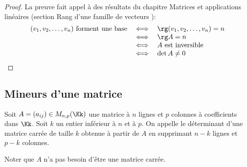 \documentclass[class=report,crop=false]{standalone}
\begin{document}
\begin{proof}
La preuve fait appel à des résultats du chapitre \og Matrices et applications linéaires \fg{}
(section \og Rang d'une famille de vecteurs \fg):
\[
\begin{array}{rcl}
(v_1,v_2,\ldots,v_n) \text{ forment une base}
&\iff& \rg(v_1,v_2,\ldots,v_n) = n \\
&\iff& \rg A = n \\
&\iff& A \text{ est inversible} \\
&\iff& \det A \neq 0
\end{array}
\]
\end{proof}


\subsection{Mineurs d'une matrice}

\begin{definition}
Soit $A=(a_{ij}) \in M_{n,p}(\Kk)$ une matrice à $n$ lignes
et $p$ colonnes à coefficients dans $\Kk$.
Soit $k$ un entier inférieur à $n$ et à $p$.
On appelle 
le déterminant d'une matrice carrée de taille $k$ obtenue à partir
de $A$ en supprimant $n-k$ lignes et $p-k$ colonnes.
\end{definition}

Noter que $A$ n'a pas besoin d'être une matrice carrée. \\
\end{document}
